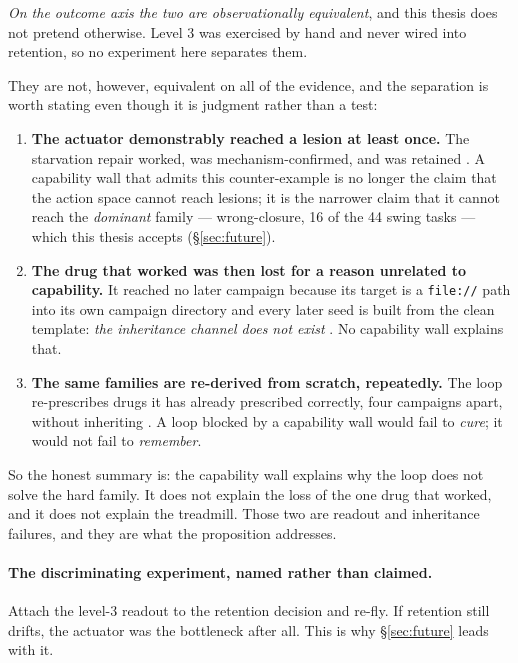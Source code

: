 \emph{On the outcome axis the two are observationally equivalent}, and this
thesis does not pretend otherwise. Level 3 was exercised by hand
 and never wired into retention, so no experiment here
separates them.

They are not, however, equivalent on all of the evidence, and the
separation is worth stating even though it is  judgment rather than
a test:

\begin{enumerate}
  \item \textbf{The actuator demonstrably reached a lesion at least once.}
        The starvation repair worked, was mechanism-confirmed, and was
        retained . A capability wall that admits this counter-example
        is no longer the claim that the action space cannot reach lesions;
        it is the narrower claim that it cannot reach the \emph{dominant}
        family --- wrong-closure, 16 of the 44 swing tasks  --- which
        this thesis accepts (\S\ref{sec:future}).
  \item \textbf{The drug that worked was then lost for a reason unrelated
        to capability.} It reached no later campaign because its target is
        a \texttt{file://} path into its own campaign directory and every
        later seed is built from the clean template: \emph{the inheritance
        channel does not exist} . No capability wall explains that.
  \item \textbf{The same families are re-derived from scratch, repeatedly.}
        The loop re-prescribes drugs it has already prescribed correctly,
        four campaigns apart, without inheriting . A loop blocked by
        a capability wall would fail to \emph{cure}; it would not fail to
        \emph{remember}.
\end{enumerate}

So the honest summary is: the capability wall explains why the loop does
not solve the hard family. It does not explain the loss of the one drug
that worked, and it does not explain the treadmill. Those two are
readout and inheritance failures, and they are what the proposition
addresses.

\paragraph{The discriminating experiment, named rather than claimed.}
Attach the level-3 readout to the retention decision and re-fly. If
retention still drifts, the actuator was the bottleneck after all. This is
why \S\ref{sec:future} leads with it.

